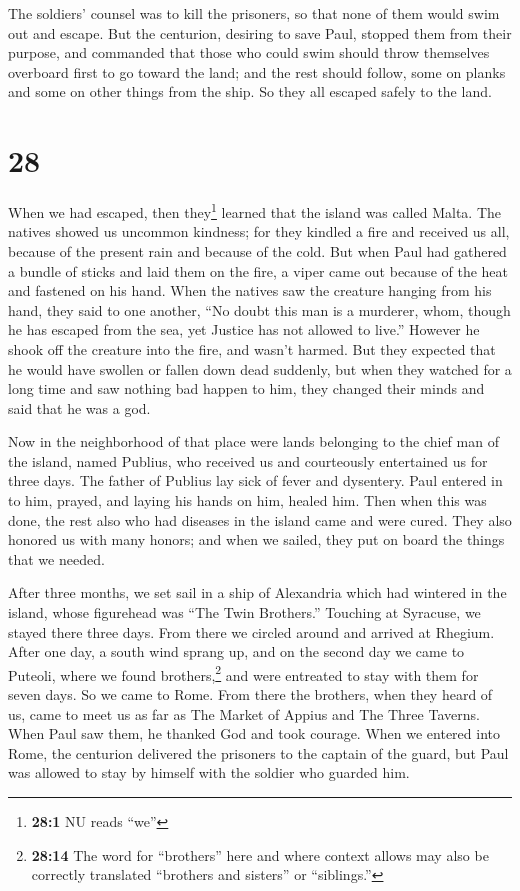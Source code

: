  The soldiers' counsel was to kill the prisoners, so that
none of them would swim out and escape.  But the
centurion, desiring to save Paul, stopped them from their purpose, and
commanded that those who could swim should throw themselves overboard
first to go toward the land;  and the rest should follow,
some on planks and some on other things from the ship. So they all
escaped safely to the land.

\hypertarget{section-27}{%
\section{28}\label{section-27}}

 When we had escaped, then they\footnote{\textbf{28:1} NU
  reads ``we''} learned that the island was called Malta. 
The natives showed us uncommon kindness; for they kindled a fire and
received us all, because of the present rain and because of the cold.
 But when Paul had gathered a bundle of sticks and laid
them on the fire, a viper came out because of the heat and fastened on
his hand.  When the natives saw the creature hanging from
his hand, they said to one another, ``No doubt this man is a murderer,
whom, though he has escaped from the sea, yet Justice has not allowed to
live.''  However he shook off the creature into the fire,
and wasn't harmed.  But they expected that he would have
swollen or fallen down dead suddenly, but when they watched for a long
time and saw nothing bad happen to him, they changed their minds and
said that he was a god.

 Now in the neighborhood of that place were lands
belonging to the chief man of the island, named Publius, who received us
and courteously entertained us for three days.  The father
of Publius lay sick of fever and dysentery. Paul entered in to him,
prayed, and laying his hands on him, healed him.  Then
when this was done, the rest also who had diseases in the island came
and were cured.  They also honored us with many honors;
and when we sailed, they put on board the things that we needed.

 After three months, we set sail in a ship of Alexandria
which had wintered in the island, whose figurehead was ``The Twin
Brothers.''  Touching at Syracuse, we stayed there three
days.  From there we circled around and arrived at
Rhegium. After one day, a south wind sprang up, and on the second day we
came to Puteoli,  where we found brothers,\footnote{\textbf{28:14}
  The word for ``brothers'' here and where context allows may also be
  correctly translated ``brothers and sisters'' or ``siblings.''} and
were entreated to stay with them for seven days. So we came to Rome.
 From there the brothers, when they heard of us, came to
meet us as far as The Market of Appius and The Three Taverns. When Paul
saw them, he thanked God and took courage.  When we
entered into Rome, the centurion delivered the prisoners to the captain
of the guard, but Paul was allowed to stay by himself with the soldier
who guarded him.

